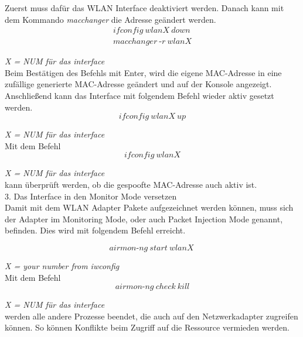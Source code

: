 Zuerst muss dafür das WLAN Interface deaktiviert werden. Danach kann mit dem Kommando \textit{macchanger} die Adresse geändert werden.\\

\begin{equation*}
\begin{split}
ifconfig~wlanX~down\\
macchanger~\text{-}r~wlanX
\end{split}
\end{equation*}

\textit{X = NUM für das interface}\\

Beim Bestätigen des Befehls mit Enter, wird die eigene MAC-Adresse in eine zufällige generierte MAC-Adresse geändert und auf der Konsole angezeigt. Anschließend kann das Interface mit folgendem Befehl wieder aktiv gesetzt werden.\\
 
$$ifconfig~wlanX~up$$

\textit{X = NUM für das interface}\\


Mit dem Befehl\\ 
$$ifconfig~wlanX$$

\textit{X = NUM für das interface}\\

kann überprüft werden, ob die gespoofte MAC-Adresse auch aktiv ist.\\

{\Large 3. Das Interface in den Monitor Mode versetzen}\\

Damit mit dem WLAN Adapter Pakete aufgezeichnet werden können, muss sich der Adapter im Monitoring Mode, oder auch Packet Injection Mode genannt, befinden. Dies wird mit folgendem Befehl erreicht.

$$airmon\text{-}ng~start~wlanX~$$

\textit{X = your number from iwconfig}\\

Mit dem Befehl\\ 

$$airmon\text{-}ng~check~kill$$

\textit{X = NUM für das interface}\\


werden alle andere Prozesse beendet, die auch auf den Netzwerkadapter zugreifen können. So können Konflikte beim Zugriff auf die Ressource vermieden werden.\\

